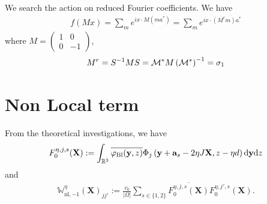 \documentclass[11pt,a4paper,reqno,french,tikz]{amsart}
\def\d{{\rm d}}
\newcommand{\pa}[1]{\left( #1 \right)} %
\newcommand{\ab}[1]{\left|#1\right|} %
\newcommand\vp{\varphi} %
\newcommand{\f}[2]{\frac{#1}{#2}} %
\newcommand{\mat}[1]{\begin{pmatrix} #1 \end{pmatrix}} %
\def\bX{{\mathbf X}}
\def\ba{{\mathbf a}}
\def\by{{\mathbf y}}
\def\bbW{{\mathbb W}}
\begin{document}
We search the action on reduced Fourier coefficients. We have
\begin{align*}
f(M x) = \sum_m e^{i x \cdot M\pa{m a^*}} = \sum_m e^{i x \cdot \pa{M^r m}a^*}
\end{align*}
where $M = \mat{1 & 0 \\ 0 & -1}$,
\begin{align*}
M^r = S^{-1} M S = \cM^* M \pa{\cM^*}^{-1} = \sigma_1
\end{align*}


\section{Non Local term}%
\label{sec:non_local_term}

From the theoretical investigations, we have
\begin{align*}
F_0^{\eta,j,s}(\bX) := \int_{\R^3} \overline{\vp_{\text{Bl}}(\by,z)} \Phi_j\pa{\by +\ba_s -2\eta J \bX,z-\eta d} \d \by \d z
\end{align*}
and
\begin{align*}
\bbW_{\text{nl},-1}^\eta\pa{\bX}_{jj'} := \f{v_0}{\ab{\Omega}} \sum_{s \in \{1,2\}} \overline{F_0^{\eta,j,s}(\bX)} F_0^{\eta,j',s}(\bX).
\end{align*}
\end{document}
